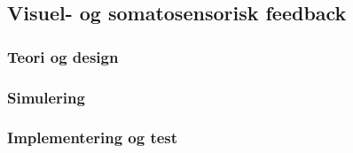 \subsection{Visuel- og somatosensorisk feedback}
\subsubsection{Teori og design}
\subsubsection{Simulering}
\subsubsection{Implementering og test}